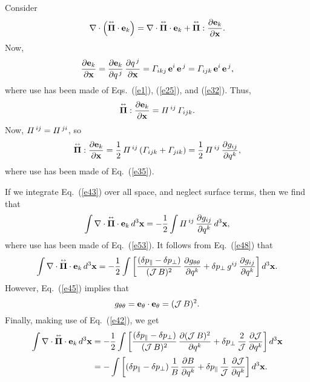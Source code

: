 \documentclass[12pt,prb,aps,notitlepage]{revtex4-1}
\newcommand{\bPi}{\mbox{\boldmath$\Pi$}}
\newcommand{\smalltensor}[1]{\overset{\text{\tiny$\leftrightarrow$}}{#1}}
\begin{document}
 Consider
 \begin{equation}\label{e43}
 \nabla\cdot\left(\smalltensor{\bPi}\cdot {\bf e}_k\right)= \nabla\cdot\smalltensor{\bPi}\cdot{\bf e}_k+ \smalltensor{\bPi}:\frac{\partial {\bf e}_k}{\partial{\bf x}}.
 \end{equation}
 Now,
  \begin{equation}
 \frac{\partial {\bf e}_k}{\partial{\bf x}}= \frac{\partial{\bf e}_k}{\partial q^{\,j}}\,\frac{\partial q^{\,j}}{\partial {\bf x}}= {\mit\Gamma}_{ikj}\,{\bf e}^i\,{\bf e}^{\,j}
 = {\mit\Gamma}_{ijk}\,{\bf e}^i\,{\bf e}^{\,j},
 \end{equation}
 where use has been made of Eqs.~(\ref{e1}), (\ref{e25}), and (\ref{e32}). 
 Thus,
 \begin{equation}
 \smalltensor{\bPi}:\frac{\partial {\bf e}_k}{\partial{\bf x}}= {\mit\Pi}^{\,ij}\,{\mit\Gamma}_{ijk}.
 \end{equation}
 Now,  ${\mit\Pi}^{\,ij}={\mit\Pi}^{\,ji}$, so  
 \begin{equation}\label{e53}
 \smalltensor{\bPi}:\frac{\partial {\bf e}_k}{\partial{\bf x}}= \frac{1}{2}\,{\mit\Pi}^{\,ij}\left({\mit\Gamma}_{ijk}+{\mit\Gamma}_{jik}\right)= \frac{1}{2}\,{\mit\Pi}^{\,ij}\,\frac{\partial g_{ij}}{\partial q^k},
 \end{equation}
 where use has been made of Eq.~(\ref{e35}).
 
 If we integrate Eq.~(\ref{e43}) over all space, and neglect surface terms, then we find that
 \begin{equation}
 \int \nabla\cdot\smalltensor{\bPi}\cdot{\bf e}_k\,d^3{\bf x}= - \frac{1}{2}\int {\mit\Pi}^{\,ij}\,\frac{\partial g_{ij}}{\partial q^k}\,d^3{\bf x},
 \end{equation}
 where use has been made of Eq.~(\ref{e53}). It follows from Eq.~(\ref{e48}) that
 \begin{equation}
 \int \nabla\cdot\smalltensor{\bPi}\cdot{\bf e}_k\,d^3{\bf x}= - \frac{1}{2}\int \left[\frac{(\delta p_\parallel-\delta p_\perp)}{({\cal J}\,B)^2}\,\frac{\partial g_{\theta\theta}}{\partial q^k}+\delta p_\perp\,g^{ij}\,\frac{\partial g_{ij}}{\partial q^k}\right]d^3{\bf x}.
 \end{equation}
 However, Eq.~(\ref{e45}) implies that
 \begin{equation}\label{gtt}
 g_{\theta\theta}= {\bf e}_\theta\cdot{\bf e}_\theta = ({\cal J}\,B)^2.
 \end{equation}
 Finally, making use of Eq.~(\ref{e42}), we get
 \begin{align}\label{e57}
 \int \nabla\cdot\smalltensor{\bPi}\cdot{\bf e}_k\,d^3{\bf x}&= - \frac{1}{2}\int \left[\frac{(\delta p_\parallel-\delta p_\perp)}{({\cal J}\,B)^2}\,\frac{\partial ({\cal J}\,B)^2}{\partial q^k}+\delta p_\perp\,\frac{2}{{\cal J}}\,\frac{\partial{\cal J}}{\partial q^k}\right]d^3{\bf x}\nonumber\\[0.5ex]
 &= -\int \left[(\delta p_\parallel-\delta p_\perp)\,\frac{1}{B}\,\frac{\partial B}{\partial q^k}+\delta p_\parallel\,\frac{1}{{\cal J}}\,\frac{\partial{\cal J}}{\partial q^k}\right]d^3{\bf x}.
 \end{align}
 
\end{document}

